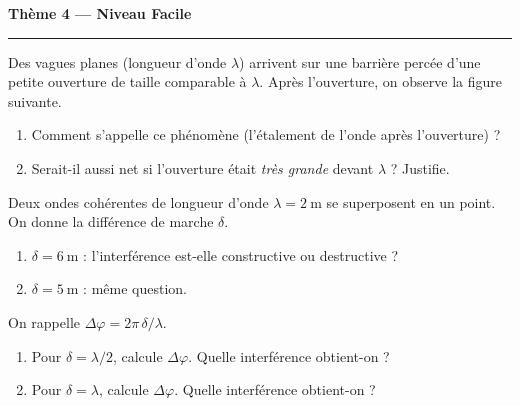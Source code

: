 \documentclass[11pt,a4paper]{article}
\newcommand{\vv}[1]{\vec{#1}}\newcommand{\ds}{\displaystyle}
\begin{document}
\begin{center}
{\large\bfseries\color{primarydark} Thème 4 — Niveau Facile}\\[-2pt]
{\color{primary}\rule{5cm}{1pt}}
\end{center}

\begin{exo}
Des vagues planes (longueur d'onde $\lambda$) arrivent sur une barrière percée d'une petite
ouverture de taille comparable à $\lambda$. Après l'ouverture, on observe la figure suivante.
\begin{center}
\end{center}
\begin{enumerate}[label=\alph*)]
  \item Comment s'appelle ce phénomène (l'étalement de l'onde après l'ouverture) ?
  \item Serait-il aussi net si l'ouverture était \emph{très grande} devant $\lambda$ ? Justifie.
\end{enumerate}
\end{exo}

\begin{exo}
Deux ondes cohérentes de longueur d'onde $\lambda=\SI{2}{\metre}$ se superposent en un point. On
donne la différence de marche $\delta$.
\begin{enumerate}[label=\alph*)]
  \item $\delta=\SI{6}{\metre}$ : l'interférence est-elle constructive ou destructive ?
  \item $\delta=\SI{5}{\metre}$ : même question.
\end{enumerate}
\end{exo}

\begin{exo}
On rappelle $\Delta\varphi=2\pi\,\delta/\lambda$.
\begin{enumerate}[label=\alph*)]
  \item Pour $\delta=\lambda/2$, calcule $\Delta\varphi$. Quelle interférence obtient-on ?
  \item Pour $\delta=\lambda$, calcule $\Delta\varphi$. Quelle interférence obtient-on ?
\end{enumerate}
\end{exo}
\end{document}
